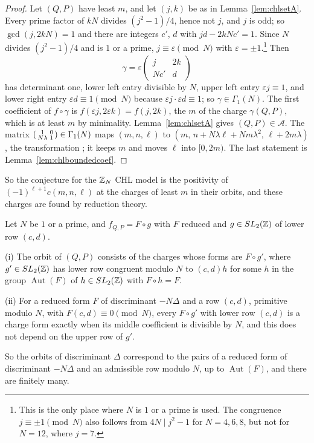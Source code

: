 \begin{proof}
Let $(Q,P)$ have least $m$, and let $(j,k)$ be as in Lemma~\ref{lem:chlsetA}. Every prime factor of $kN$ divides $(j^2-1)/4$, hence not $j$, and $j$ is odd; so $\gcd(j,2kN)=1$ and there are integers $c'$, $d$ with $jd-2kNc'=1$. Since $N$ divides $(j^2-1)/4$ and is $1$ or a prime, $j\equiv\varepsilon\pmod N$ with $\varepsilon=\pm1$.\footnote{This is the only place where $N$ is $1$ or a prime is used. The congruence $j\equiv\pm1\pmod N$ also follows from $4N\mid j^2-1$ for $N=4,6,8$, but not for $N=12$, where $j=7$.} Then
\[
\gamma=\varepsilon\begin{pmatrix}j&2k\\Nc'&d\end{pmatrix}
\]
has determinant one, lower left entry divisible by $N$, upper left entry $\varepsilon j\equiv1$, and lower right entry $\varepsilon d\equiv1\pmod N$ because $\varepsilon j\cdot\varepsilon d\equiv1$; so $\gamma\in\Gamma_1(N)$. The first coefficient of $f\circ\gamma$ is $f(\varepsilon j,2\varepsilon k)=f(j,2k)$, the $m$ of the charge $\gamma(Q,P)$, which is at least $m$ by minimality. Lemma~\ref{lem:chlsetA} gives $(Q,P)\in\mathcal A$. The matrix $\begin{psmallmatrix}1&0\\N\lambda&1\end{psmallmatrix}\in\Gamma_1(N)$ maps $(m,n,\ell)$ to $(m,\,n+N\lambda\ell+Nm\lambda^2,\,\ell+2m\lambda)$, the transformation \cite[(5.62)]{BSS25}; it keeps $m$ and moves $\ell$ into $[0,2m)$. The last statement is Lemma~\ref{lem:chlboundedcoef}.
\end{proof}

So the conjecture for the $\mathbb{Z}_N$ CHL model is the positivity of $(-1)^{\ell+1}c(m,n,\ell)$ at the charges of least $m$ in their orbits, and these charges are found by reduction theory.

\begin{lemma}\label{lem:chlorbits}
Let $N$ be $1$ or a prime, and $f_{Q,P}=F\circ g$ with $F$ reduced and $g\in SL_2(\mathbb{Z})$ of lower row $(c,d)$.

\textup{(i)} The orbit of $(Q,P)$ consists of the charges whose forms are $F\circ g'$, where $g'\in SL_2(\mathbb{Z})$ has lower row congruent modulo $N$ to $(c,d)h$ for some $h$ in the group $\operatorname{Aut}(F)$ of $h\in SL_2(\mathbb{Z})$ with $F\circ h=F$.

\textup{(ii)} For a reduced form $F$ of discriminant $-N\Delta$ and a row $(c,d)$, primitive modulo $N$, with $F(c,d)\equiv0\pmod N$, every $F\circ g'$ with lower row $(c,d)$ is a charge form exactly when its middle coefficient is divisible by $N$, and this does not depend on the upper row of $g'$.

So the orbits of discriminant $\Delta$ correspond to the pairs of a reduced form of discriminant $-N\Delta$ and an admissible row modulo $N$, up to $\operatorname{Aut}(F)$, and there are finitely many.
\end{lemma}


